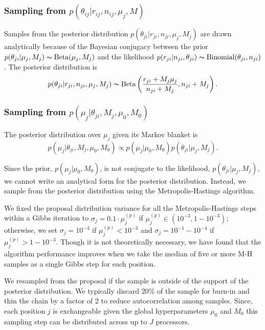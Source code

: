 \documentclass[11pt,reqno]{amsart}
\begin{document}
\subsubsection{Sampling from $p \left( \theta_{ij} |r_{ij},n_{ij},\mu_j,M \right)$}

Samples from the posterior distribution
$p(\theta_{ji} | r_{ji}, n_{ji}, \mu_j, M_j)$
are drawn analytically because of the Bayesian conjugacy between the prior
$p(\theta_{ji} | \mu_j, M_j) \thicksim \text{Beta}(\mu_j, M_j)$
and the likelihood
$p(r_{ji} | n_{ji}, \theta_{ji}) \thicksim \text{Binomial}(\theta_{ji}, n_{ji})$.
The posterior distribution is
\begin{equation}
	p(\theta_{ji} | r_{ji}, n_{ji}, \mu_j, M_j) \thicksim \text{Beta}\left( \frac{r_{ji} + M_j \mu_j}{n_{ji} + M_j} , n_{ji} + M_j\right).
\end{equation}

\subsubsection{Sampling from $p \left( \mu_j |\theta_{ji},M_j,\mu_0,M_0\right)$}
The posterior distribution over $\mu_j$ given its Markov blanket is
\begin{equation}
	p( \mu_j | \theta_{ji}, M_j, \mu_0, M_0 ) \propto p(\mu_j | \mu_0, M_0) p(\theta_{ji} | \mu_j, M_j).
\end{equation}

Since the prior, $p(\mu_j | \mu_0, M_0)$, is not conjugate to the likelihood, $p(\theta_{ji} | \mu_j, M_j)$, we cannot write an analytical form for the posterior distribution. Instead, we sample from the posterior distribution using the Metropolis-Hastings algorithm.

We fixed the proposal distribution variance for all the Metropolis-Hastings steps within a Gibbs iteration to $\sigma_j = 0.1 \cdot \mu_j^{(p)}$ if $\mu_j^{(p)} \in (10^{-3},1-10^{-3})$; otherwise, we set $\sigma_j = 10^{-4}$ if $\mu_j^{(p)}< 10^{-3}$ and $\sigma_j = 10^{-1}-10^{-4}$ if $\mu_j^{(p)}>1-10^{-3}$. Though it is not theoretically necessary, we have found that the algorithm performance improves when we take the median of five or more M-H samples as a single Gibbs step for each position.


We resampled from the proposal if the sample is outside of the support of the posterior distribution. We typically discard 20\% of the sample for burn-in and thin the chain by a factor of 2 to reduce autocorrelation among samples. Since, each position $j$ is exchangeable given the global hyperparameters $\mu_0$ and $M_0$ this sampling step can be distributed across up to $J$ processors.
\end{document}
